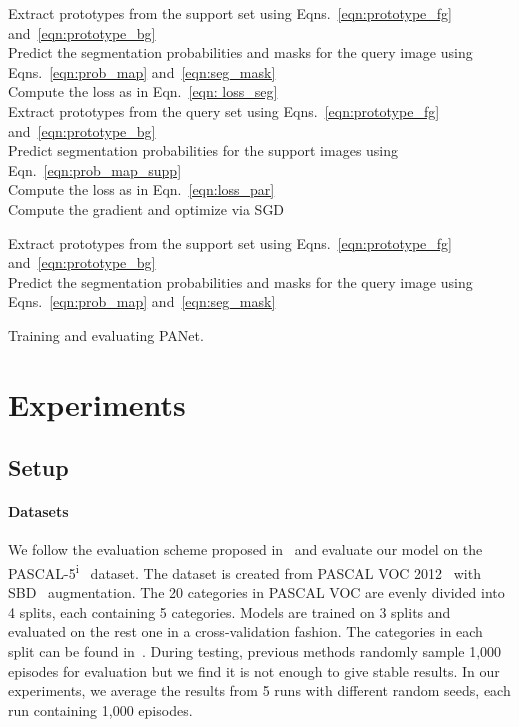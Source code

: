 \documentclass[10pt,twocolumn,letterpaper]{article}
\begin{document}
\begin{algorithm}[t]
\SetAlgoLined
\SetAlgoHangIndent{12pt}
{
Extract prototypes  from the support set  using Eqns.~\eqref{eqn:prototype_fg} and~\eqref{eqn:prototype_bg}\\
Predict the segmentation probabilities and masks for the query image using Eqns.~\eqref{eqn:prob_map} and~\eqref{eqn:seg_mask}\\
Compute the loss  as in Eqn.~\eqref{eqn: loss_seg} \\
Extract prototypes  from the query set  using Eqns.~\eqref{eqn:prototype_fg} and~\eqref{eqn:prototype_bg} \\
Predict segmentation probabilities for the support images using Eqn.~\eqref{eqn:prob_map_supp} \\
Compute the loss  as in Eqn.~\eqref{eqn:loss_par}\\
Compute the gradient and optimize via SGD
}

{
Extract prototypes  from the support set  using Eqns.~\eqref{eqn:prototype_fg} and~\eqref{eqn:prototype_bg}\\
Predict the segmentation probabilities and masks for the query image using Eqns.~\eqref{eqn:prob_map} and~\eqref{eqn:seg_mask}
}

  \caption{Training and evaluating PANet.}\label{algo}
\end{algorithm}

\section{Experiments}

\subsection{Setup}
 
 \paragraph{Datasets} We follow the evaluation scheme proposed in~\cite{shaban2017one} and evaluate our model on the  {PASCAL-5\textsuperscript{i}}~\cite{shaban2017one} dataset. The dataset is created from PASCAL VOC 2012~\cite{everingham2010pascal} with SBD~\cite{hariharan2011semantic} augmentation. The 20 categories in PASCAL VOC are evenly divided into 4 splits, each containing 5 categories.  Models are trained on 3 splits and evaluated on the rest one in a cross-validation fashion. The categories in each split can be found in~\cite{shaban2017one}. During testing, previous methods randomly sample 1,000 episodes for evaluation but we find it is not enough to give stable results. In our experiments, we average the results from 5 runs with different random seeds, each run containing 1,000 episodes.
 
\end{document}
